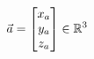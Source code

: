 \documentclass[preview]{standalone}
\begin{document}
\begin{align*}
\special{dvisvgm:raw <g id='unique000'>}\vec{a} = \begin{bmatrix} x_a \\ y_a \\ z_a \end{bmatrix} \in \mathbb{R}^{3}\special{dvisvgm:raw </g>}
\end{align*}
\end{document}
